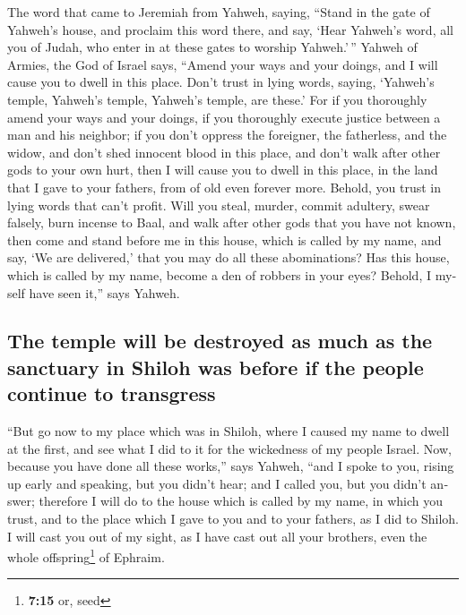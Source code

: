 \begin{paracol}{2}
\begin{otherlanguage}{english}
 The word that came to Jeremiah from Yahweh, saying,
 ``Stand in the gate of Yahweh's house, and proclaim this
word there, and say, `Hear Yahweh's word, all you of Judah, who enter in
at these gates to worship Yahweh.'\,''  Yahweh of Armies,
the God of Israel says, ``Amend your ways and your doings, and I will
cause you to dwell in this place.  Don't trust in lying
words, saying, `Yahweh's temple, Yahweh's temple, Yahweh's temple, are
these.'  For if you thoroughly amend your ways and your
doings, if you thoroughly execute justice between a man and his
neighbor;  if you don't oppress the foreigner, the
fatherless, and the widow, and don't shed innocent blood in this place,
and don't walk after other gods to your own hurt,  then I
will cause you to dwell in this place, in the land that I gave to your
fathers, from of old even forever more.  Behold, you trust
in lying words that can't profit.  Will you steal, murder,
commit adultery, swear falsely, burn incense to Baal, and walk after
other gods that you have not known,  then come and stand
before me in this house, which is called by my name, and say, `We are
delivered,' that you may do all these abominations?  Has
this house, which is called by my name, become a den of robbers in your
eyes? Behold, I myself have seen it,'' says Yahweh.

\hypertarget{the-temple-will-be-destroyed-as-much-as-the-sanctuary-in-shiloh-was-before-if-the-people-continue-to-transgress}{%
\subsection{The temple will be destroyed as much as the sanctuary in
Shiloh was before if the people continue to
transgress}\label{the-temple-will-be-destroyed-as-much-as-the-sanctuary-in-shiloh-was-before-if-the-people-continue-to-transgress}}

 ``But go now to my place which was in Shiloh, where I
caused my name to dwell at the first, and see what I did to it for the
wickedness of my people Israel.  Now, because you have
done all these works,'' says Yahweh, ``and I spoke to you, rising up
early and speaking, but you didn't hear; and I called you, but you
didn't answer;  therefore I will do to the house which is
called by my name, in which you trust, and to the place which I gave to
you and to your fathers, as I did to Shiloh.  I will cast
you out of my sight, as I have cast out all your brothers, even the
whole offspring\footnote{\textbf{7:15} or, seed} of Ephraim.


\end{otherlanguage}
\end{paracol}
